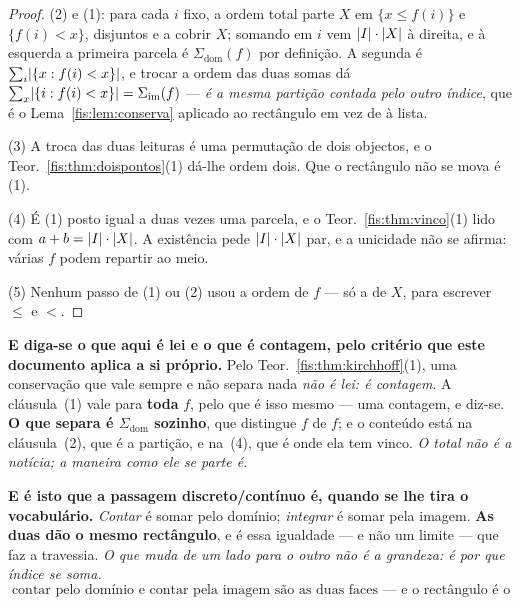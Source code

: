 \documentclass[livro.tex]{subfiles}
\begin{document}
\begin{proof}
(2) e (1): para cada $i$ fixo, a ordem total parte $X$ em $\{x\le f(i)\}$ e
$\{f(i)<x\}$, disjuntos e a cobrir $X$; somando em $i$ vem $\lvert I\rvert\cdot\lvert X\rvert$ à
direita, e à esquerda a primeira parcela é $\Sigma_{\mathrm{dom}}(f)$ por
definição. A segunda é $\sum_i\lvert \{x:f(i)<x\}\rvert$, e trocar a ordem das duas
somas dá $\sum_x\lvert \{i:f(i)<x\}\rvert=\Sigma_{\mathrm{im}}(f)$ --- \emph{é a mesma
partição contada pelo outro índice}, que é o Lema~\ref{fis:lem:conserva} aplicado
ao rectângulo em vez de à lista.

(3) A troca das duas leituras é uma permutação de dois objectos, e o
Teor.~\ref{fis:thm:doispontos}(1) dá-lhe ordem dois. Que o rectângulo não se mova
é (1).

(4) É (1) posto igual a duas vezes uma parcela, e o Teor.~\ref{fis:thm:vinco}(1)
lido com $a+b=\lvert I\rvert\cdot\lvert X\rvert$. A existência pede $\lvert I\rvert\cdot\lvert X\rvert$ par, e a
unicidade não se afirma: várias $f$ podem repartir ao meio.

(5) Nenhum passo de (1) ou (2) usou a ordem de $f$ --- só a de $X$, para
escrever $\le$ e $<$.
\end{proof}

\medskip\noindent\textbf{E diga-se o que aqui é lei e o que é contagem, pelo
critério que este documento aplica a si próprio.} Pelo
Teor.~\ref{fis:thm:kirchhoff}(1), uma conservação que vale sempre e não separa
nada \emph{não é lei: é contagem}. A cláusula~(1) vale para \textbf{toda} $f$,
pelo que é isso mesmo --- uma contagem, e diz-se. \textbf{O que separa é
$\Sigma_{\mathrm{dom}}$ sozinho}, que distingue $f$ de $f$; e o conteúdo está na
cláusula~(2), que é a partição, e na~(4), que é onde ela tem vinco. \emph{O total
não é a notícia; a maneira como ele se parte é.}


\medskip\noindent\textbf{E é isto que a passagem discreto/contínuo é, quando se
lhe tira o vocabulário.} \emph{Contar} é somar pelo domínio; \emph{integrar} é
somar pela imagem. \textbf{As duas dão o mesmo rectângulo}, e é essa igualdade
--- e não um limite --- que faz a travessia. \emph{O que muda de um lado para o
outro não é a grandeza: é por que índice se soma.}
\[
\boxed{\;\text{contar pelo domínio e contar pela imagem são as duas faces --- e o rectângulo é o invariante}\;}
\]
\end{document}
